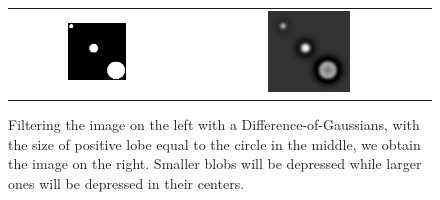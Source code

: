 \documentclass{llncs}
\begin{document}
\begin{figure}[]
  \begin{center}
    \begin{tabular}{cc}
       \includegraphics[width=0.35\textwidth]{figs/attention/dog1} &
       \includegraphics[width=0.35\textwidth]{figs/attention/dog2}
    \end{tabular}
    \caption{\label{fig:multiscale}Filtering the image on the left
     with a Difference-of-Gaussians, with the size of positive lobe
     equal to the circle in the middle, we obtain the
     image on the right. Smaller blobs will be depressed while larger
     ones will be depressed in their centers.}
  \end{center}
\end{figure}

\end{document}
